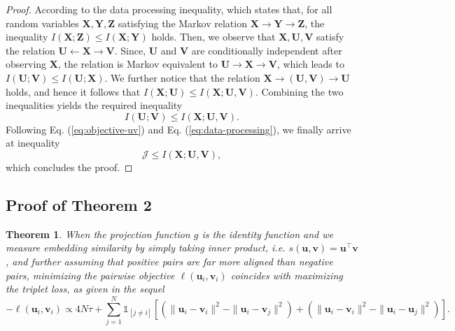\documentclass{article}
\newtheorem{theorem}{Theorem}[section]
\theoremstyle{remark}
\begin{document}
\begin{proof}
According to the data processing inequality, which states that, for all random variables $\mathbf{X}, \mathbf{Y}, \mathbf{Z}$ satisfying the Markov relation $\mathbf{X} \rightarrow \mathbf{Y} \rightarrow \mathbf{Z}$, the inequality $I(\mathbf{X}; \mathbf{Z}) \leq I(\mathbf{X}; \mathbf{Y})$ holds.
Then, we observe that $\mathbf{X}, \mathbf{U}, \mathbf{V}$ satisfy the relation $\mathbf{U} \leftarrow \mathbf{X} \rightarrow \mathbf{V}$. Since, $\mathbf{U}$ and $\mathbf{V}$ are conditionally independent after observing $\mathbf{X}$, the relation is Markov equivalent to $\mathbf{U} \rightarrow \mathbf{X} \rightarrow \mathbf{V}$, which leads to $I(\mathbf{U}; \mathbf{V}) \leq I(\mathbf{U}; \mathbf{X})$.
We further notice that the relation $\mathbf{X} \rightarrow (\mathbf{U}, \mathbf{V}) \rightarrow \mathbf{U}$ holds, and hence it follows that $I(\mathbf{X}; \mathbf{U}) \leq I(\mathbf{X}; \mathbf{U}, \mathbf{V})$.
Combining the two inequalities yields the required inequality
\begin{equation}
	\label{eq:data-processing}
	I(\mathbf U; \mathbf V) \leq I(\mathbf X; \mathbf U, \mathbf V).
\end{equation}
Following Eq. (\ref{eq:objective-uv}) and Eq. (\ref{eq:data-processing}), we finally arrive at inequality
\begin{equation}
	\mathcal{J} \leq I(\mathbf X; \mathbf U, \mathbf V),
\end{equation}
which concludes the proof.
\end{proof}







\subsection{Proof of Theorem 2}

\begin{theorem}
\label{thm:objective-triplet-loss}
When the projection function \(g\) is the identity function and we measure embedding similarity by simply taking inner product, i.e. \(s(\bm{u}, \bm{v}) = \bm{u}^\top \bm{v}\), and further assuming that positive pairs are far more aligned than negative pairs, minimizing the pairwise objective \(\ell(\bm u_i, \bm v_i)\) coincides with maximizing the triplet loss, as given in the sequel
\begin{equation}
	- \ell(\bm u_i, \bm v_i) \propto 4N \tau + \sum_{j=1}^N  \mathds 1_{[j \neq i]} \left[ \left(\| {\bm u_i} - {\bm v_i} \|^2 - \| {\bm u_i} - {\bm v_j} \|^2\right) + \left(\| {\bm u_i} - {\bm v_i} \|^2 - \| {\bm u_i} - {\bm u_j} \|^2\right) \right].
\end{equation}
\end{theorem}
\end{document}
